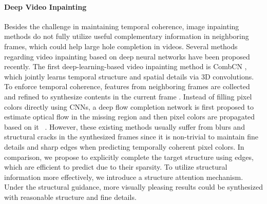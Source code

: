 \paragraph{Deep Video Inpainting}
Besides the challenge in maintaining temporal coherence, image inpainting methods do not fully utilize useful complementary information in neighboring frames, which could help large hole completion in videos.
Several methods regarding video inpainting based on deep neural networks have been proposed recently.
%
The first deep-learning-based video inpainting method is CombCN \cite{wang2019video}, which jointly learns temporal structure and spatial details via 3D convolutions.
%
To enforce temporal coherence, features from neighboring frames are collected and refined to synthesize contents in the current frame \cite{Kim_2019_CVPR1,Kim_2019_CVPR}. 
Instead of filling pixel colors directly using CNNs, a deep flow completion network is first proposed to estimate optical flow in the missing region and then pixel colors are propagated based on it ~\cite{Xu_2019_CVPR}.
However, these existing methods usually suffer from blurs and structural cracks in the synthesized frames since it is non-trivial to maintain fine details and sharp edges when predicting temporally coherent pixel colors. 
In comparison, we propose to explicitly complete the target structure using edges, which are efficient to predict due to their sparsity. To utilize structural information more effectively, we introduce a structure attention mechanism. 
Under the structural guidance, more visually pleasing results could be synthesized with reasonable structure and fine details. 






























